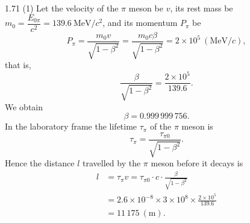 \begin{solution}{1.71}
(1) Let the velocity of the $\pi$ meson be $v$, its rest mass be $m_0=\dfrac{E_{0\pi}}{c^2}=139.6\ \mathrm{MeV}/c^2$, and its momentum $P_\pi$ be
\[
P_\pi=\frac{m_0v}{\sqrt{1-\beta^2}}=\frac{m_0c\beta}{\sqrt{1-\beta^2}}=2\times10^5\ (\mathrm{MeV}/c),
\]
that is,
\[
\frac{\beta}{\sqrt{1-\beta^2}}=\frac{2\times10^5}{139.6}.
\]
We obtain
\[
\beta=0.999\,999\,756.
\]
In the laboratory frame the lifetime $\tau_\pi$ of the $\pi$ meson is
\[
\tau_\pi=\frac{\tau_{\pi0}}{\sqrt{1-\beta^2}}.
\]
Hence the distance $l$ travelled by the $\pi$ meson before it decays is
\begin{align*}
l&=\tau_\pi v=\tau_{\pi0}\cdot c\cdot\frac{\beta}{\sqrt{1-\beta^2}}\\
&=2.6\times10^{-8}\times3\times10^8\times\frac{2\times10^5}{139.6}\\
&=11\,175\ (\mathrm{m}).
\end{align*}


\end{solution}
